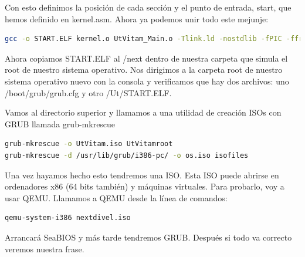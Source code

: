 \documentclass[12pt, twoside]{report}
\begin{document}
Con esto definimos la posición de cada sección y el punto de entrada, start, que hemos definido en kernel.asm. Ahora ya podemos unir todo este mejunje:

\begin{lstlisting}[language=bash]
gcc -o START.ELF kernel.o UtVitam_Main.o -Tlink.ld -nostdlib -fPIC -ffreestanding -lgcc
\end{lstlisting}

Ahora copiamos START.ELF al /next dentro de nuestra carpeta que simula el root de nuestro sistema operativo. Nos dirigimos a la carpeta root de nuestro sistema operativo nuevo con la consola y verificamos que hay dos archivos: uno /boot/grub/grub.cfg y otro /Ut/START.ELF.

Vamos al directorio superior y llamamos a una utilidad de creación ISOs con GRUB llamada grub-mkrescue

\begin{lstlisting}[language=bash]
grub-mkrescue -o UtVitam.iso UtVitamroot
grub-mkrescue -d /usr/lib/grub/i386-pc/ -o os.iso isofiles
\end{lstlisting}


Una vez hayamos hecho esto tendremos una ISO. Esta ISO puede abrirse en ordenadores x86 (64 bits también) y máquinas virtuales. Para probarlo, voy a usar QEMU. Llamamos a QEMU desde la línea de comandos:

\begin{lstlisting}[language=bash]
qemu-system-i386 nextdivel.iso

\end{lstlisting}

Arrancará SeaBIOS y más tarde tendremos GRUB. Después si todo va correcto veremos nuestra frase.




\end{document}
